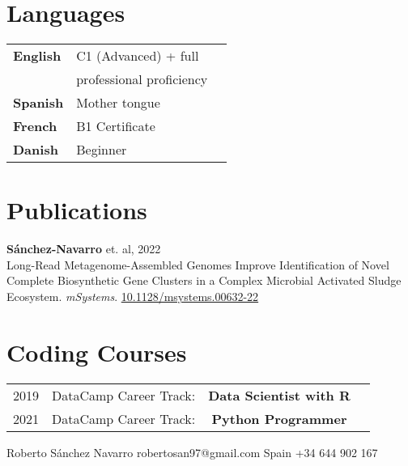 \documentclass[lighthipster]{simplehipstercv}
\newlength{\rightcolwidth}
\begin{document}
\begin{paracol}{2}
\vspace{2em}

\begin{minipage}[t]{0.3\textwidth}


\section*{Languages}
\begin{tabular}{l | ll}
\textbf{English} & C1 (Advanced) + full \\
&  professional proficiency \\
\textbf{Spanish} & {Mother tongue} \\
\textbf{French} & B1 Certificate \\
\textbf{Danish} & Beginner \\
\end{tabular}

\end{minipage}\hfill
\begin{minipage}[t]{0.37\textwidth}
\section*{Publications}
\textbf{Sánchez-Navarro} et. al, 2022 \\ 
Long-Read Metagenome-Assembled Genomes Improve Identification of Novel Complete Biosynthetic Gene Clusters in a Complex Microbial Activated Sludge Ecosystem. \textit{mSystems}. \href{https://doi.org/10.1128/msystems.00632-22}{10.1128/msystems.00632-22}
\bigskip


\end{minipage}

\section*{Coding Courses}
\begin{tabular}{r|ccc}
2019 & DataCamp Career Track: & \textbf{Data Scientist with R} \\
2021 & DataCamp Career Track: & \textbf{Python Programmer} \\
\end{tabular}
\bigskip




\vfill{} %

\setlength{\parindent}{0pt}
\begin{minipage}[t]{\rightcolwidth}
\begin{center}\fontfamily{\sfdefault}\selectfont \color{black!70}
{\small Roberto Sánchez Navarro  robertosan97@gmail.com  Spain  +34 644 902 167 
}
\end{center}
\end{minipage}

\end{paracol}
\end{document}
